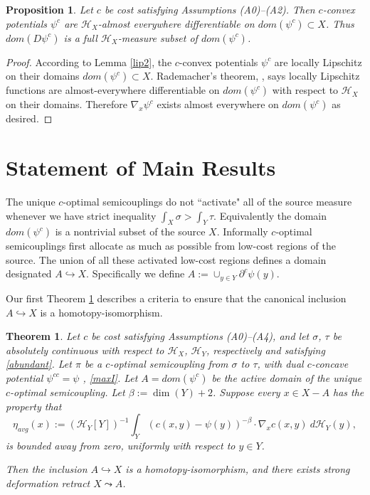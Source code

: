 \documentclass[12pt]{amsart}
\newtheorem{thm}{Theorem}
\newtheorem{prop}{Proposition}
\theoremstyle{definition}
\theoremstyle{remark}
\newcommand{\del}{\partial}
\begin{document}
\begin{prop}\label{lip3} 
Let $c$ be cost satisfying Assumptions (A0)--(A2). Then $c$-convex potentials $\psi^c$ are $\mathscr{H}_X$-almost everywhere differentiable on $dom(\psi^c) \subset X$. Thus $dom(D \psi^c)$ is a full $\mathscr{H}_X$-measure subset of $dom(\psi^c)$.
\end{prop}
\begin{proof}
According to Lemma \ref{lip2}, the $c$-convex potentials $\psi^c$ are locally Lipschitz on their domains $dom(\psi^c) \subset X$. Rademacher's theorem, \cite[Thm 10.8, pp.222]{Vil1}, says locally Lipschitz functions are almost-everywhere differentiable on $dom(\psi^c)$ with respect to $\mathscr{H}_X$ on their domains. Therefore $\nabla_x \psi^c$ exists almost everywhere on $dom (\psi^c)$ as desired.
\end{proof}









\section{Statement of Main Results }
 The unique $c$-optimal semicouplings do not ``activate" all of the source measure whenever we have strict inequality $\int_X \sigma > \int_Y \tau$.  Equivalently the domain $dom(\psi^c)$ is a nontrivial subset of the source $X$. Informally $c$-optimal semicouplings first allocate as much as possible from low-cost regions of the source. The union of all these activated low-cost regions defines a domain designated $A \hookrightarrow X$. Specifically we define $A:=\cup_{y\in Y} \del^c \psi(y)$. 



Our first Theorem \ref{A} describes a criteria to ensure that the canonical inclusion $A\hookrightarrow X$ is a homotopy-isomorphism.
\begin{thm}\label{A} 
Let $c$ be cost satisfying Assumptions (A0)--(A4), and let $\sigma$, $\tau$ be absolutely continuous with respect to $\mathscr{H}_X$, $\mathscr{H}_Y$, respectively and satisfying \eqref{abundant}. Let $\pi$ be a $c$-optimal semicoupling from $\sigma$ to $\tau$, with dual $c$-concave potential $\psi^{cc}=\psi$ , \ref{maxI}. Let $A=dom(\psi^c)$ be the active domain of the unique $c$-optimal semicoupling. Let $\beta:=\dim(Y)+2$. Suppose every $x\in X-A$ has the property that \begin{equation} \label{thmaeta}
\eta_{avg}(x):=(\mathscr{H}_Y[Y])^{-1} \int_{Y} (c(x,y)-\psi(y))^{-\beta}\cdot\nabla_x c(x,y) ~d\mathscr{H}_Y(y),  
\end{equation} is bounded away from zero, uniformly with respect to $y\in Y$. 

Then the inclusion $A \hookrightarrow X$ is a homotopy-isomorphism, and there exists strong deformation retract $X\leadsto A$. 
\end{thm}
\end{document}
